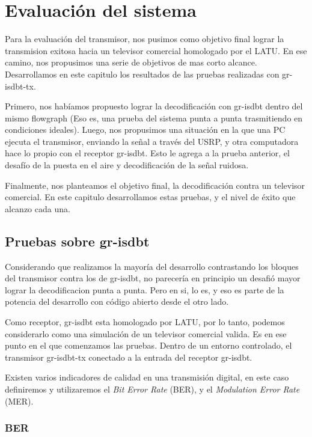 \chapter{Evaluación del sistema}

Para la evaluación del transmisor, nos pusimos como objetivo final lograr la transmision exitosa hacia un televisor comercial homologado por el LATU. En ese camino, nos propusimos una serie de objetivos de mas corto alcance. Desarrollamos en este capitulo los resultados de las pruebas realizadas con gr-isdbt-tx.

Primero, nos habíamos propuesto lograr la decodificación con gr-isdbt dentro del mismo flowgraph (Eso es, una prueba del sistema punta a punta trasmitiendo en condiciones ideales). Luego, nos propusimos una situación en la que una PC ejecuta el transmisor, enviando la señal a través del USRP, y otra computadora hace lo propio con el receptor gr-isdbt. Esto le agrega a la prueba anterior, el desafío de la puesta en el aire y decodificación de la señal ruidosa.

Finalmente, nos planteamos el objetivo final, la decodificación contra un televisor comercial. En este capitulo desarrollamos estas pruebas, y el nivel de éxito que alcanzo cada una.

\section{Pruebas sobre gr-isdbt}

Considerando que realizamos la mayoría del desarrollo contrastando los bloques del transmisor contra los de gr-isdbt, no parecería en principio un desafió mayor lograr la decodificacion punta a punta. Pero en si, lo es, y eso es parte de la potencia del desarrollo con código abierto desde el otro lado. 

Como receptor, gr-isdbt esta homologado por LATU, por lo tanto, podemos considerarlo como una simulación de un televisor comercial valida. Es en ese punto en el que comenzamos las pruebas. Dentro de un entorno controlado, el transmisor gr-isdbt-tx conectado a la entrada del receptor gr-isdbt.

Existen varios indicadores de calidad en una transmisión digital, en este caso definiremos y utilizaremos el \textit{Bit Error Rate} (BER), y el \textit{Modulation Error Rate} (MER).

\subsection{BER}


